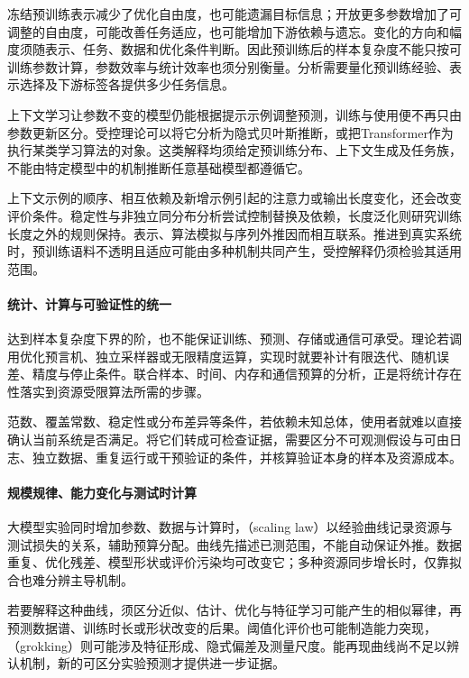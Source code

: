 冻结预训练表示减少了优化自由度，也可能遗漏目标信息；开放更多参数增加了可调整的自由度，可能改善任务适应，也可能增加下游依赖与遗忘。变化的方向和幅度须随表示、任务、数据和优化条件判断。因此预训练后的样本复杂度不能只按可训练参数计算，参数效率与统计效率也须分别衡量。分析需要量化预训练经验、表示选择及下游标签各提供多少任务信息。

上下文学习让参数不变的模型仍能根据提示示例调整预测，训练与使用便不再只由参数更新区分。受控理论可以将它分析为隐式贝叶斯推断，或把Transformer作为执行某类学习算法的对象。这类解释均须给定预训练分布、上下文生成及任务族，不能由特定模型中的机制推断任意基础模型都遵循它。

上下文示例的顺序、相互依赖及新增示例引起的注意力或输出长度变化，还会改变评价条件。稳定性与非独立同分布分析尝试控制替换及依赖，长度泛化则研究训练长度之外的规则保持。表示、算法模拟与序列外推因而相互联系。推进到真实系统时，预训练语料不透明且适应可能由多种机制共同产生，受控解释仍须检验其适用范围。

\paragraph{统计、计算与可验证性的统一}

达到样本复杂度下界的阶，也不能保证训练、预测、存储或通信可承受。理论若调用优化预言机、独立采样器或无限精度运算，实现时就要补计有限迭代、随机误差、精度与停止条件。联合样本、时间、内存和通信预算的分析，正是将统计存在性落实到资源受限算法所需的步骤。

范数、覆盖常数、稳定性或分布差异等条件，若依赖未知总体，使用者就难以直接确认当前系统是否满足。将它们转成可检查证据，需要区分不可观测假设与可由日志、独立数据、重复运行或干预验证的条件，并核算验证本身的样本及资源成本。

\paragraph{规模规律、能力变化与测试时计算}

大模型实验同时增加参数、数据与计算时，（scaling law）以经验曲线记录资源与测试损失的关系，辅助预算分配。曲线先描述已测范围，不能自动保证外推。数据重复、优化残差、模型形状或评价污染均可改变它；多种资源同步增长时，仅靠拟合也难分辨主导机制。

若要解释这种曲线，须区分近似、估计、优化与特征学习可能产生的相似幂律，再预测数据谱、训练时长或形状改变的后果。阈值化评价也可能制造能力突现，（grokking）则可能涉及特征形成、隐式偏差及测量尺度。能再现曲线尚不足以辨认机制，新的可区分实验预测才提供进一步证据。

